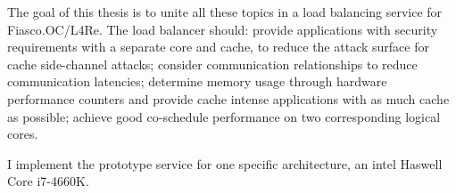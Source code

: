 The goal of this thesis is to unite all these topics in a load balancing
service for Fiasco.OC/L4Re.
The load balancer should: provide applications with security requirements with
a separate core and cache, to reduce the attack surface for cache side-channel
attacks;
consider communication relationships to reduce communication latencies;
determine memory usage through hardware performance counters and provide cache
intense applications with as much cache as possible;
achieve good co-schedule performance on two corresponding logical cores.

I implement the prototype service for one specific architecture, an \gls{intel}
Haswell Core i7-4660K.



\begin{comment}

\begin{itemize}
  \item introduction to relevant terminology
  \item SMT, symbiotic scheduling, co-schedule, measurement difficulties
  \item Congestion awareness of shared resources; Goal minimal slowdown for all
    applications; fairness, cache weights, pain metric, reliance on default
    scheduler, performance counters
  \item communication awareness: compute-communicate cycle, distribution of one
    application
  \item don't haves: No CMP architecture -> SMT-SMP combination; client server
    communication model;
  \item Fiasco.OC: no logic, just mechanisms in the kernel, hence no balancing;
  \item L4Re: no automatic, behaviour based balancing.
  \item do: communication models: HPC, CL-SVR; behaviour analysis: perf
    counters; SMT-SMP processor awareness, reduced conflicts in shared hardware
    resources, only on-line measurements;
  \item secure/real-time/exclusive core design.
\end{itemize}


\begin{itemize}
  \item Current processor architectures don't use CMP processors any more, therefore
    the cache layout is different. My work evaluates the research results on the
    new HW layout. But AMD Opteron Barcelona had a similar cache layout.
  \item User level scheduling on a $µ$-kernel. But user level scheduling was
    done before.
  \item More scheduling parameters \textit{or} less assumptions about threads.
  \item No off-line measurements, only on-line information gathering.
  \item Thread interaction possible (communication partner, security flag)
  \item Designated cores for security critical applications.
\end{itemize}

\end{comment}

